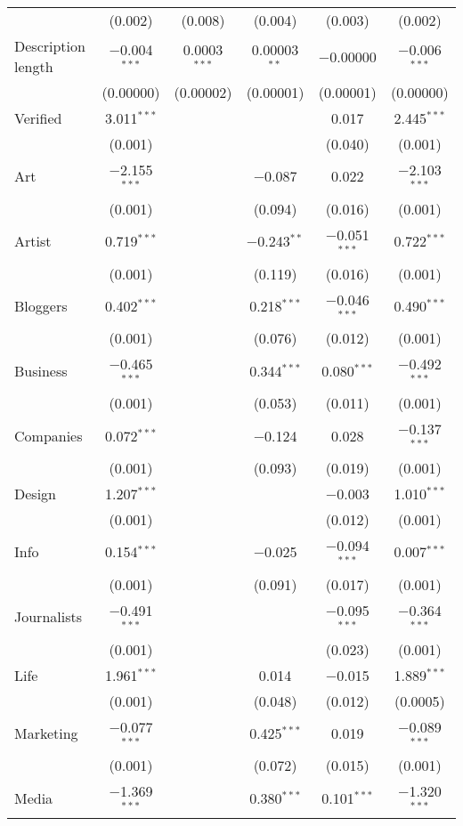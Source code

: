 \begin{table}[!htbp]
\begin{tabular}{@{\extracolsep{5pt}}lccccc}
  & (0.002) & (0.008) & (0.004) & (0.003) & (0.002) \\ 
  Description length & $-$0.004$^{***}$ & 0.0003$^{***}$ & 0.00003$^{**}$ & $-$0.00000 & $-$0.006$^{***}$ \\ 
  & (0.00000) & (0.00002) & (0.00001) & (0.00001) & (0.00000) \\ 
  Verified & 3.011$^{***}$ &  &  & 0.017 & 2.445$^{***}$ \\ 
  & (0.001) &  &  & (0.040) & (0.001) \\ 
  Art & $-$2.155$^{***}$ &  & $-$0.087 & 0.022 & $-$2.103$^{***}$ \\ 
  & (0.001) &  & (0.094) & (0.016) & (0.001) \\ 
  Artist & 0.719$^{***}$ &  & $-$0.243$^{**}$ & $-$0.051$^{***}$ & 0.722$^{***}$ \\ 
  & (0.001) &  & (0.119) & (0.016) & (0.001) \\ 
  Bloggers & 0.402$^{***}$ &  & 0.218$^{***}$ & $-$0.046$^{***}$ & 0.490$^{***}$ \\ 
  & (0.001) &  & (0.076) & (0.012) & (0.001) \\ 
  Business & $-$0.465$^{***}$ &  & 0.344$^{***}$ & 0.080$^{***}$ & $-$0.492$^{***}$ \\ 
  & (0.001) &  & (0.053) & (0.011) & (0.001) \\ 
  Companies & 0.072$^{***}$ &  & $-$0.124 & 0.028 & $-$0.137$^{***}$ \\ 
  & (0.001) &  & (0.093) & (0.019) & (0.001) \\ 
  Design & 1.207$^{***}$ &  &  & $-$0.003 & 1.010$^{***}$ \\ 
  & (0.001) &  &  & (0.012) & (0.001) \\ 
  Info & 0.154$^{***}$ &  & $-$0.025 & $-$0.094$^{***}$ & 0.007$^{***}$ \\ 
  & (0.001) &  & (0.091) & (0.017) & (0.001) \\ 
  Journalists & $-$0.491$^{***}$ &  &  & $-$0.095$^{***}$ & $-$0.364$^{***}$ \\ 
  & (0.001) &  &  & (0.023) & (0.001) \\ 
  Life & 1.961$^{***}$ &  & 0.014 & $-$0.015 & 1.889$^{***}$ \\ 
  & (0.001) &  & (0.048) & (0.012) & (0.0005) \\ 
  Marketing & $-$0.077$^{***}$ &  & 0.425$^{***}$ & 0.019 & $-$0.089$^{***}$ \\ 
  & (0.001) &  & (0.072) & (0.015) & (0.001) \\ 
  Media & $-$1.369$^{***}$ &  & 0.380$^{***}$ & 0.101$^{***}$ & $-$1.320$^{***}$ \\ 

\end{tabular}
\end{table}
